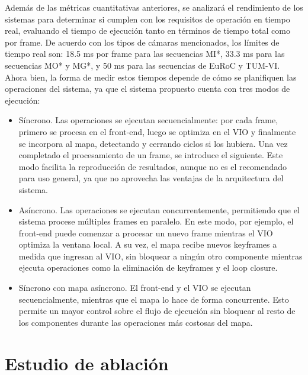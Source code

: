 Además de las métricas cuantitativas anteriores, se analizará el rendimiento de los sistemas para determinar si cumplen con los requisitos de operación en tiempo real, evaluando el tiempo de ejecución tanto en términos de tiempo total como por frame. De acuerdo con los tipos de cámaras mencionados, los límites de tiempo real son: 18.5 ms por frame para las secuencias MI*, 33.3 ms para las secuencias MO* y MG*, y 50 ms para las secuencias de EuRoC y TUM-VI. Ahora bien, la forma de medir estos tiempos depende de cómo se planifiquen las operaciones del sistema, ya que el sistema propuesto cuenta con tres modos de ejecución:
\begin{itemize}
    \item Síncrono. Las operaciones se ejecutan secuencialmente: por cada frame, primero se procesa en el front-end, luego se optimiza en el VIO y finalmente se incorpora al mapa, detectando y cerrando ciclos si los hubiera. Una vez completado el procesamiento de un frame, se introduce el siguiente. Este modo facilita la reproducción de resultados, aunque no es el recomendado para uso general, ya que no aprovecha las ventajas de la arquitectura del sistema.
    \item Asíncrono. Las operaciones se ejecutan concurrentemente, permitiendo que el sistema procese múltiples frames en paralelo. En este modo, por ejemplo, el front-end puede comenzar a procesar un nuevo frame mientras el VIO optimiza la ventana local. A su vez, el mapa recibe nuevos keyframes a medida que ingresan al VIO, sin bloquear a ningún otro componente mientras ejecuta operaciones como la eliminación de keyframes y el loop closure.
    \item Síncrono con mapa asíncrono. El front-end y el VIO se ejecutan secuencialmente, mientras que el mapa lo hace de forma concurrente. Esto permite un mayor control sobre el flujo de ejecución sin bloquear al resto de los componentes durante las operaciones más costosas del mapa.
\end{itemize}

\section{Estudio de ablación}

